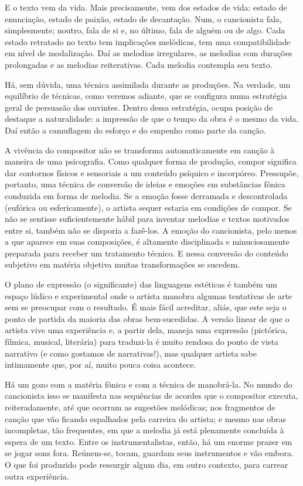 E o texto vem da vida. Mais precisamente, vem dos estados de vida:
estado de enunciação, estado de paixão, estado de decantação. Num, o
cancionista fala, simplesmente; noutro, fala de si e, no último, fala de
alguém ou de algo. Cada estado retratado no texto tem implicações
melódicas, tem uma compatibilidade em nível de modalização. Daí as
melodias irregulares, as melodias com durações prolongadas e as melodias
reiterativas. Cada melodia contempla seu texto.

Há, sem dúvida, uma técnica assimilada durante as produções. Na verdade,
um equilíbrio de técnicas, como veremos adiante, que se configura numa
estratégia geral de persuasão dos ouvintes. Dentro dessa estratégia,
ocupa posição de destaque a naturalidade: a impressão de que o tempo da
obra é o mesmo da vida. Daí então a camuflagem do esforço e do empenho
como parte da canção.~

A vivência do compositor não se transforma automaticamente em canção à
maneira de uma psicografia. Como qualquer forma de produção, compor
significa dar contornos físicos e sensoriais a um conteúdo psíquico e
incorpóreo. Pressupõe, portanto, uma técnica de conversão de ideias e
emoções em substâncias fônica conduzida em forma de melodia. Se a emoção
fosse derramada e descontrolada (eufórica ou esfericamente), o artista
sequer estaria em condições de compor. Se não se sentisse
suficientemente hábil para inventar melodias e textos motivados entre
si, também não se disporia a fazê-los. A emoção do cancionista, pelo
menos a que aparece em suas composições, é altamente disciplinada e
minuciosamente preparada para receber um tratamento técnico. E nessa
conversão do conteúdo subjetivo em matéria objetiva muitas
transformações se sucedem.~

O plano de expressão (o significante) das linguagens estéticas é também
um espaço lúdico e experimental onde o artista manobra algumas
tentativas de arte sem se preocupar com o resultado. É mais fácil
acreditar, aliás, que este seja o ponto de partida da maioria das obras
bem-sucedidas. A versão linear de que o artista vive uma experiência e,
a partir dela, maneja uma expressão (pictórica, fílmica, musical,
literária) para traduzi-la é muito rendosa do ponto de vista narrativo
(e como gostamos de narrativas!), mas qualquer artista sabe intimamente
que, por aí, muito pouca coisa acontece.

Há um gozo com a matéria fônica e com a técnica de manobrá-la. No mundo
do cancionista isso se manifesta nas sequências de acordes que o
compositor executa, reiteradamente, até que ocorram as sugestões
melódicas; nos fragmentos de canção que vão ficando espalhados pela
carreira do artista; e mesmo nas obras incompletas, tão frequentes, em
que a melodia já está plenamente concluída à espera de um texto. Entre
os instrumentalistas, então, há um enorme prazer em se jogar sons fora.
Reúnem-se, tocam, guardam seus instrumentos e vão embora. O que foi
produzido pode ressurgir algum dia, em outro contexto, para carrear
outra experiência.~

